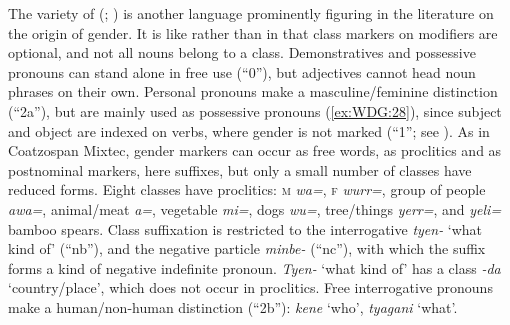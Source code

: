 \documentclass[output=collectionpaper]{langsci/langscibook}
\begin{document}
The  variety of  (; \citealt{Reid1990}) is another language prominently figuring in the literature on the origin of gender. It is like  rather than  in that class markers on modifiers are optional, and not all nouns belong to a class. Demonstratives and possessive pronouns can stand alone in free use (``0''), but adjectives cannot head noun phrases on their own. Personal pronouns make a masculine/feminine distinction (``2a''), but are mainly used as possessive pronouns (\ref{ex:WDG:28}), since subject and object are indexed on verbs, where gender is not marked (``1''; see ). As in Coatzospan Mixtec, gender markers can occur as free words, as proclitics and as postnominal markers, here suffixes, but only a small number of classes have reduced forms. Eight classes have proclitics: \textsc{m} \textit{wa=}, \textsc{f} \textit{wurr=}, group of people \textit{awa=}, animal/meat \textit{a=}, vegetable \textit{mi=}, dogs \textit{wu=}, tree/things \textit{yerr=}, and \textit{yeli=} bamboo spears. Class suffixation is restricted to the interrogative \textit{tyen-} `what kind of' (``nb''), and the negative particle \textit{minbe-} (``nc''), with which the suffix forms a kind of negative indefinite pronoun. \textit{Tyen-} `what kind of' has a class \textit{-da} `country/place', which does not occur in proclitics. Free interrogative pronouns make a human/non-human distinction (``2b''): \textit{kene} `who', \textit{tyagani} `what'.

\begin{table}
\caption{Ngan\textquotesingle{}gityemerri Nangikurrunggurr nominal morphology\label{tab:WDG:9}}
\end{table}
\end{document}
